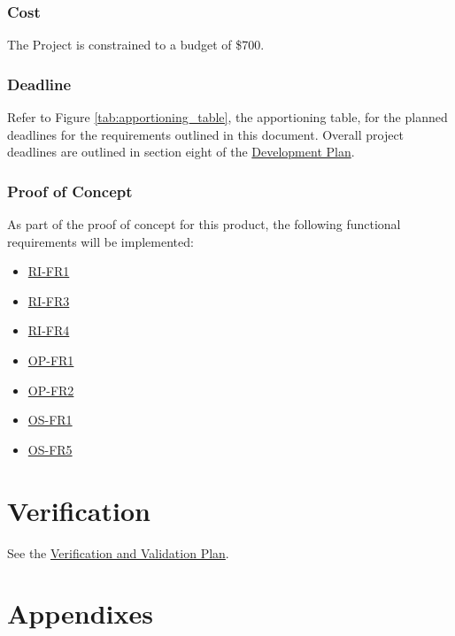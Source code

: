 \documentclass{article}
\begin{document}
\subsubsection{Cost}

The Project is constrained to a budget of \$700.

\subsubsection{Deadline}

Refer to Figure \ref{tab:apportioning_table}, the apportioning table, for the planned deadlines for the requirements outlined in this document. Overall project deadlines are outlined in section eight of the \href{https://github.com/russellrd/realm/blob/main/docs/DevelopmentPlan/DevelopmentPlan.pdf}{Development Plan}.

\subsubsection{Proof of Concept}

As part of the proof of concept for this product, the following functional requirements will be implemented:

\begin{itemize}
    \item \hyperref[ssub:realm_interface]{RI-FR1}
    \item \hyperref[ssub:realm_interface]{RI-FR3}
    \item \hyperref[ssub:realm_interface]{RI-FR4}
    \item \hyperref[ssub:object_placement]{OP-FR1}
    \item \hyperref[ssub:object_placement]{OP-FR2}
    \item \hyperref[ssub:obj_scan]{OS-FR1}
    \item \hyperref[ssub:obj_scan]{OS-FR5}
\end{itemize}

\section{Verification}

See the \href{https://github.com/russellrd/realm/blob/main/docs/VnVPlan/VnVPlan.pdf}{Verification and Validation Plan}.

\section{Appendixes}
\end{document}

